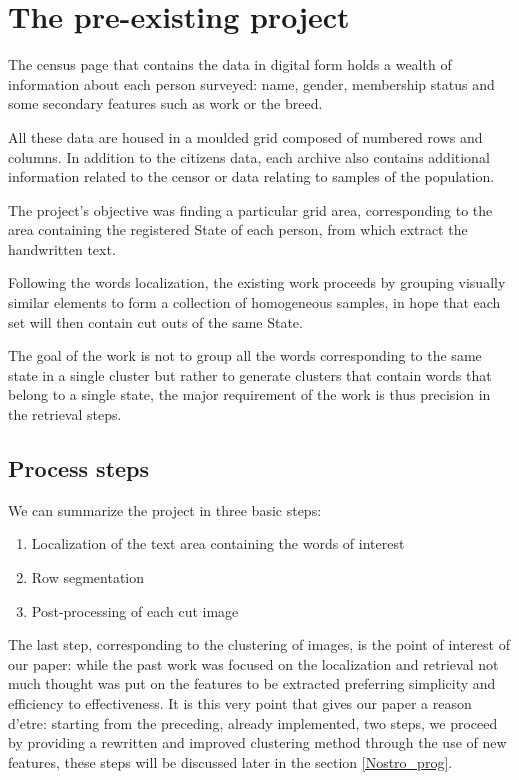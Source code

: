 \section{The pre-existing project}

The census page that contains the data in digital form holds a wealth of information about each person surveyed: name, gender, membership status and some secondary features such as work or the breed. 

All these data are housed in a moulded grid composed of numbered rows and columns. In addition to the citizens data, each archive also contains additional information related to the censor or data relating to samples of the population.

The project's objective was finding a particular grid area, corresponding to the area containing the registered State of each person, from which extract the handwritten text.

Following the words localization, the existing work proceeds by grouping visually similar elements to form a collection of homogeneous samples, in hope that each set will then contain cut outs of the same State.

The goal of the work is not to group all the words corresponding to the same state in a single cluster but rather to generate clusters that contain words that belong to a single state, the major requirement of the work is thus precision in the retrieval steps.

\subsection{Process steps}

We can summarize the project in three basic steps:
\begin{enumerate}
\item Localization of the text area containing the words of interest
\item Row segmentation
\item Post-processing of each cut image
\end{enumerate}

The last step, corresponding to the clustering of images, is the point of interest of our paper: while the past work was focused on the localization and retrieval not much thought was put on the features to be extracted preferring simplicity and efficiency to effectiveness.
It is this very point that gives our paper a reason d'etre: starting from the preceding, already implemented, two steps, we proceed by providing a rewritten and improved clustering method through the use of new features, these steps will be discussed later in the section \ref{Nostro_prog}.

